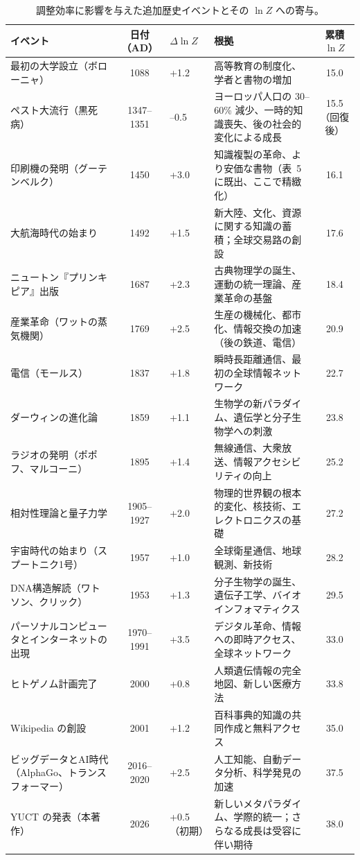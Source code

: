 \documentclass[12pt,a4paper]{article}
\theoremstyle{remark}
\begin{document}
	\begin{table}[htbp]
		\centering
		\caption{調整効率に影響を与えた追加歴史イベントとその \(\ln Z\) への寄与。}
		\label{tab:expanded-events}
		\scriptsize  
		\begin{tabular}{p{3.2cm} c p{2.5cm} p{4.5cm} c}
			\toprule
			\textbf{イベント} & \textbf{日付（AD）} & \textbf{\(\Delta \ln Z\)} & \textbf{根拠} & \textbf{累積 \(\ln Z\)} \\
			\midrule
			最初の大学設立（ボローニャ） & 1088 & +1.2 & 高等教育の制度化、学者と書物の増加 & 15.0 \\
			ペスト大流行（黒死病） & 1347–1351 & –0.5 & ヨーロッパ人口の 30–60\% 減少、一時的知識喪失、後の社会的変化による成長 & 15.5（回復後） \\
			印刷機の発明（グーテンベルク） & 1450 & +3.0 & 知識複製の革命、より安価な書物（表~5 に既出、ここで精緻化） & 16.1 \\
			大航海時代の始まり & 1492 & +1.5 & 新大陸、文化、資源に関する知識の蓄積；全球交易路の創設 & 17.6 \\
			ニュートン『プリンキピア』出版 & 1687 & +2.3 & 古典物理学の誕生、運動の統一理論、産業革命の基盤 & 18.4 \\
			産業革命（ワットの蒸気機関） & 1769 & +2.5 & 生産の機械化、都市化、情報交換の加速（後の鉄道、電信） & 20.9 \\
			電信（モールス） & 1837 & +1.8 & 瞬時長距離通信、最初の全球情報ネットワーク & 22.7 \\
			ダーウィンの進化論 & 1859 & +1.1 & 生物学の新パラダイム、遺伝学と分子生物学への刺激 & 23.8 \\
			ラジオの発明（ポポフ、マルコーニ） & 1895 & +1.4 & 無線通信、大衆放送、情報アクセシビリティの向上 & 25.2 \\
			相対性理論と量子力学 & 1905–1927 & +2.0 & 物理的世界観の根本的変化、核技術、エレクトロニクスの基礎 & 27.2 \\
			宇宙時代の始まり（スプートニク1号） & 1957 & +1.0 & 全球衛星通信、地球観測、新技術 & 28.2 \\
			DNA構造解読（ワトソン、クリック） & 1953 & +1.3 & 分子生物学の誕生、遺伝子工学、バイオインフォマティクス & 29.5 \\
			パーソナルコンピュータとインターネットの出現 & 1970–1991 & +3.5 & デジタル革命、情報への即時アクセス、全球ネットワーク & 33.0 \\
			ヒトゲノム計画完了 & 2000 & +0.8 & 人類遺伝情報の完全地図、新しい医療方法 & 33.8 \\
			Wikipedia の創設 & 2001 & +1.2 & 百科事典的知識の共同作成と無料アクセス & 35.0 \\
			ビッグデータとAI時代（AlphaGo、トランスフォーマー） & 2016–2020 & +2.5 & 人工知能、自動データ分析、科学発見の加速 & 37.5 \\
			YUCT の発表（本著作） & 2026 & +0.5（初期） & 新しいメタパラダイム、学際的統一；さらなる成長は受容に伴い期待 & 38.0 \\
			\bottomrule
		\end{tabular}
	\end{table}
	
\end{document}
